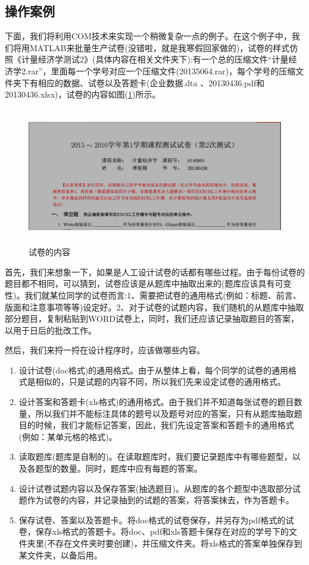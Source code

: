     \subsection{操作案例}
        \par
        下面，我们将利用COM技术来实现一个稍微复杂一点的例子。在这个例子中，我们将用MATLAB来批量生产试卷(没错啦，就是我寒假回家做的)，试卷的样式仿照《计量经济学测试2》(具体内容在相关文件夹下):有一个总的压缩文件“计量经济学2.rar”，里面每一个学号对应一个压缩文件(20135064.rar)，每个学号的压缩文件夹下有相应的数据、试卷以及答题卡(企业数据.dta 、20130436.pdf和20130436.xlsx)，试卷的内容如图(\ref{fig:试卷的内容})所示。
        \begin{figure}[H]
        \centering
        \includegraphics[height=6cm]{images/Exam_content.jpg}
        \caption{试卷的内容}
        \label{fig:试卷的内容}
        \end{figure}
        \par
        首先，我们来想象一下，如果是人工设计试卷的话都有哪些过程。由于每份试卷的题目都不相同，可以猜到，试卷应该是从题库中抽取出来的(题库应该具有可变性)。我们就某位同学的试卷而言:1、需要把试卷的通用格式(例如：标题、前言、版面和注意事项等等)设定好。2、对于试卷的试题内容，我们随机的从题库中抽取部分题目，复制粘贴到WORD试卷上，同时，我们还应该记录抽取题目的答案，以用于日后的批改工作。
        \par
        然后，我们来捋一捋在设计程序时，应该做哪些内容。
        \begin{enumerate}
          \item 设计试卷(doc格式)的通用格式。由于从整体上看，每个同学的试卷的通用格式是相似的，只是试题的内容不同，所以我们先来设定试卷的通用格式。
          \item 设计答案和答题卡(xls格式)的通用格式。由于我们并不知道每张试卷的题目数量，所以我们并不能标注具体的题号以及题号对应的答案，只有从题库抽取题目的时候，我们才能标记答案，因此，我们先设定答案和答题卡的通用格式(例如：某单元格的格式)。
          \item 读取题库(题库是自制的)。在读取题库时，我们要记录题库中有哪些题型，以及各题型的数量。同时，题库中应有每题的答案。
          \item 设计试卷试题内容以及保存答案(抽选题目)。从题库的各个题型中选取部分试题作为试卷的内容，并记录抽到的试题的答案，将答案抹去，作为答题卡。
          \item 保存试卷、答案以及答题卡。将doc格式的试卷保存，并另存为pdf格式的试卷，保存xls格式的答题卡。将doc、pdf和xls答题卡保存在对应的学号下的文件夹里(不存在文件夹时要创建)，并压缩文件夹。将xls格式的答案单独保存到某文件夹，以备后用。
        \end{enumerate}
